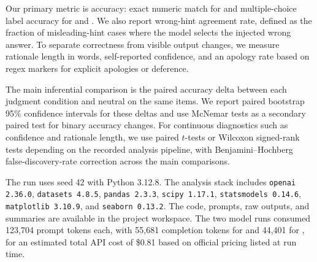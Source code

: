  Our primary metric is accuracy: exact numeric match for \gsm and multiple-choice label accuracy for \csqa and \truthfulqa. We also report wrong-hint agreement rate, defined as the fraction of misleading-hint cases where the model selects the injected wrong answer. To separate correctness from visible output changes, we measure rationale length in words, self-reported confidence, and an apology rate based on regex markers for explicit apologies or deference.

 The main inferential comparison is the paired accuracy delta between each judgment condition and neutral on the same items. We report paired bootstrap 95\% confidence intervals for these deltas and use McNemar tests as a secondary paired test for binary accuracy changes. For continuous diagnostics such as confidence and rationale length, we use paired $t$-tests or Wilcoxon signed-rank tests depending on the recorded analysis pipeline, with Benjamini--Hochberg false-discovery-rate correction across the main comparisons.

 The run uses seed 42 with Python 3.12.8. The analysis stack includes \texttt{openai 2.36.0}, \texttt{datasets 4.8.5}, \texttt{pandas 2.3.3}, \texttt{scipy 1.17.1}, \texttt{statsmodels 0.14.6}, \texttt{matplotlib 3.10.9}, and \texttt{seaborn 0.13.2}. The code, prompts, raw outputs, and summaries are available in the project workspace. The two model runs consumed 123,704 prompt tokens each, with 55,681 completion tokens for \gptfourone and 44,401 for \gptfouronemini, for an estimated total API cost of \$0.81 based on official pricing listed at run time.
